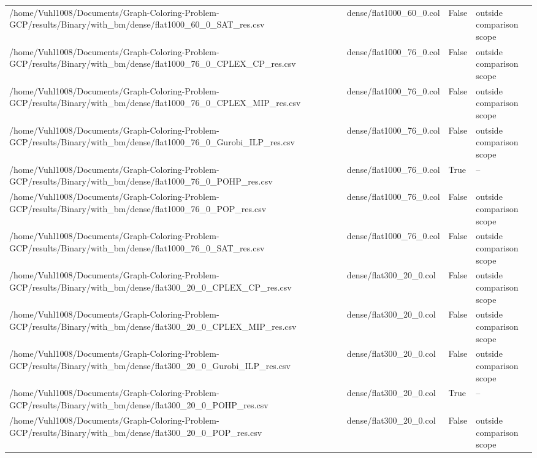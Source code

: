 \begin{table}[htbp]
\begin{tabular}{llll}
/home/Vuhl1008/Documents/Graph-Coloring-Problem-GCP/results/Binary/with\_bm/dense/flat1000\_60\_0\_SAT\_res.csv & dense/flat1000\_60\_0.col & False & outside comparison scope \\
/home/Vuhl1008/Documents/Graph-Coloring-Problem-GCP/results/Binary/with\_bm/dense/flat1000\_76\_0\_CPLEX\_CP\_res.csv & dense/flat1000\_76\_0.col & False & outside comparison scope \\
/home/Vuhl1008/Documents/Graph-Coloring-Problem-GCP/results/Binary/with\_bm/dense/flat1000\_76\_0\_CPLEX\_MIP\_res.csv & dense/flat1000\_76\_0.col & False & outside comparison scope \\
/home/Vuhl1008/Documents/Graph-Coloring-Problem-GCP/results/Binary/with\_bm/dense/flat1000\_76\_0\_Gurobi\_ILP\_res.csv & dense/flat1000\_76\_0.col & False & outside comparison scope \\
/home/Vuhl1008/Documents/Graph-Coloring-Problem-GCP/results/Binary/with\_bm/dense/flat1000\_76\_0\_POHP\_res.csv & dense/flat1000\_76\_0.col & True & -- \\
/home/Vuhl1008/Documents/Graph-Coloring-Problem-GCP/results/Binary/with\_bm/dense/flat1000\_76\_0\_POP\_res.csv & dense/flat1000\_76\_0.col & False & outside comparison scope \\
/home/Vuhl1008/Documents/Graph-Coloring-Problem-GCP/results/Binary/with\_bm/dense/flat1000\_76\_0\_SAT\_res.csv & dense/flat1000\_76\_0.col & False & outside comparison scope \\
/home/Vuhl1008/Documents/Graph-Coloring-Problem-GCP/results/Binary/with\_bm/dense/flat300\_20\_0\_CPLEX\_CP\_res.csv & dense/flat300\_20\_0.col & False & outside comparison scope \\
/home/Vuhl1008/Documents/Graph-Coloring-Problem-GCP/results/Binary/with\_bm/dense/flat300\_20\_0\_CPLEX\_MIP\_res.csv & dense/flat300\_20\_0.col & False & outside comparison scope \\
/home/Vuhl1008/Documents/Graph-Coloring-Problem-GCP/results/Binary/with\_bm/dense/flat300\_20\_0\_Gurobi\_ILP\_res.csv & dense/flat300\_20\_0.col & False & outside comparison scope \\
/home/Vuhl1008/Documents/Graph-Coloring-Problem-GCP/results/Binary/with\_bm/dense/flat300\_20\_0\_POHP\_res.csv & dense/flat300\_20\_0.col & True & -- \\
/home/Vuhl1008/Documents/Graph-Coloring-Problem-GCP/results/Binary/with\_bm/dense/flat300\_20\_0\_POP\_res.csv & dense/flat300\_20\_0.col & False & outside comparison scope \\

\end{tabular}
\end{table}

